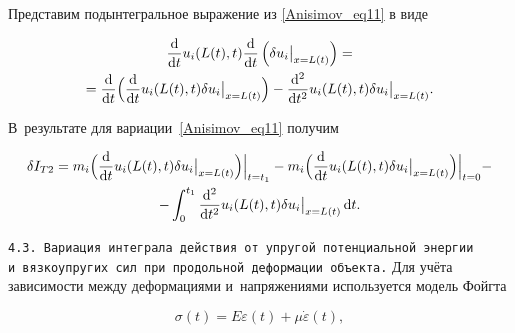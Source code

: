 Представим подынтегральное выражение из \eqref{Anisimov_eq11} в виде

\begin{multline}\nonumber

\frac{\mathrm{d}}{\mathrm{d}t} u_i( L(t), t ) \frac{\mathrm{d}}{\mathrm{d}t}\left(\delta u_i\big|_{x=L(t)}\right)=

\\

= \frac{\mathrm{d}}{\mathrm{d}t}

\Bigl(\frac{\mathrm{d}}{\mathrm{d}t}  u_i( L(t), t ) \delta u_i\big|_{x=L(t)}\Bigr)-

\frac{\mathrm{d}^2}{\mathrm{d}t^2} u_i( L(t), t ) \delta u_i\big|_{x=L(t)}.

\end{multline}

В~результате для вариации~\eqref{Anisimov_eq11} получим

\begin{multline}

\label{Anisimov_eq12}

\delta I_{T2}=

m_i \Bigl(\frac{\mathrm{d}}{\mathrm{d}t} u_i( L(t), t )

\delta u_i\big|_{x=L(t)}\Bigr)\Bigr|_{t=t_1}

-

m_i\Bigl(\frac{\mathrm{d}}{\mathrm{d}t} u_i( L(t), t )

\delta u_i\big|_{x=L(t)}\Bigr)\Bigr|_{t=0}-

\\

-

\int_0^{t_1}\frac{\mathrm{d}^2}{\mathrm{d}t^2} u_i( L(t), t ) \delta u_i\big|_{x=L(t)}\,\mathrm{d}t.

\end{multline}



\smallskip



{\tt 4.3. Вариация интеграла действия от~упругой потенциаль\-ной энергии и~вязкоупругих сил при~продольной деформации объекта.}  Для учёта зависимости между деформациями и~напряжениями используется модель Фойгта

\begin{equation}\label{Anisimov_eq13}

\sigma(t)=E\varepsilon(t)+\mu\dot{\varepsilon}(t),

\end{equation}

